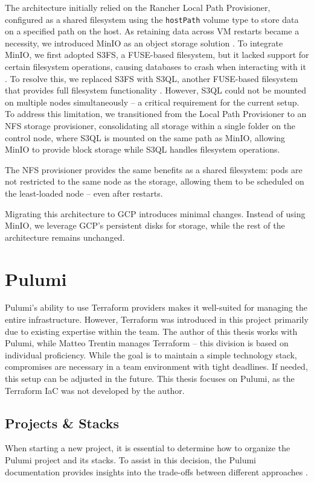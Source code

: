 The architecture initially relied on the Rancher Local Path Provisioner, configured as a shared filesystem using the \texttt{hostPath} volume type to store data on a specified path on the host. As retaining data across VM restarts became a necessity, we introduced MinIO as an object storage solution \cite{miniosdu}. To integrate MinIO, we first adopted S3FS, a FUSE-based filesystem, but it lacked support for certain filesystem operations, causing databases to crash when interacting with it \cite{s3fsrepo}. To resolve this, we replaced S3FS with S3QL, another FUSE-based filesystem that provides full filesystem functionality \cite{s3qlrepo}. However, S3QL could not be mounted on multiple nodes simultaneously \cite{s3qlfaq} -- a critical requirement for the current setup. To address this limitation, we transitioned from the Local Path Provisioner to an NFS storage provisioner, consolidating all storage within a single folder on the control node, where S3QL is mounted on the same path as MinIO, allowing MinIO to provide block storage while S3QL handles filesystem operations.

The NFS provisioner provides the same benefits as a shared filesystem: pods are not restricted to the same node as the storage, allowing them to be scheduled on the least-loaded node -- even after restarts.

Migrating this architecture to GCP introduces minimal changes. Instead of using MinIO, we leverage GCP's persistent disks for storage, while the rest of the architecture remains unchanged.

\section{Pulumi}
Pulumi's ability to use Terraform providers makes it well-suited for managing the entire infrastructure. However, Terraform was introduced in this project primarily due to existing expertise within the team. The author of this thesis works with Pulumi, while Matteo Trentin manages Terraform -- this division is based on individual proficiency. While the goal is to maintain a simple technology stack, compromises are necessary in a team environment with tight deadlines. If needed, this setup can be adjusted in the future. This thesis focuses on Pulumi, as the Terraform IaC was not developed by the author.

\subsection{Projects \& Stacks}
When starting a new project, it is essential to determine how to organize the Pulumi project and its stacks. To assist in this decision, the Pulumi documentation provides insights into the trade-offs between different approaches \cite{pulumiProjects2025}.

